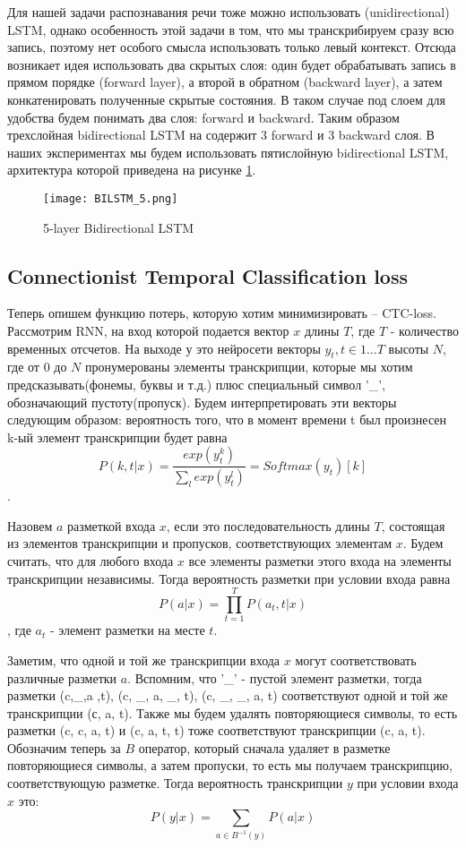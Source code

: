 \documentclass[a4paper,14pt]{extarticle}
\begin{document}
Для нашей задачи распознавания речи тоже можно использовать (unidirectional) LSTM, однако особенность этой задачи в том, что мы транскрибируем сразу всю запись, поэтому нет особого смысла использовать только левый контекст. Отсюда возникает идея использовать два скрытых слоя: один будет обрабатывать запись в прямом порядке (forward layer), а второй в обратном (backward layer), а затем конкатенировать полученные скрытые состояния. В таком случае под слоем для удобства будем понимать два слоя: forward и backward. Таким образом трехслойная bidirectional LSTM на содержит 3 forward и 3 backward слоя. В наших экспериментах мы будем использовать пятислойную bidirectional LSTM, архитектура которой приведена на рисунке \ref{5_bilstm}.
\begin{figure}[!h]
	\centering
	\texttt{[image: BILSTM\_5.png]}%
	\caption{5-layer Bidirectional LSTM}
	\label{5_bilstm}
\end{figure}
\subsection{Connectionist Temporal Classification loss}
Теперь опишем функцию потерь, которую хотим минимизировать -- CTC-loss.
Рассмотрим RNN, на вход которой подается вектор $x$ длины $T$, где $T$ - количество временных отсчетов. На выходе у это нейросети векторы $y_t, t \in 1\dots T$ высоты $N$, где от $0$ до $N$ пронумерованы элементы транскрипции, которые мы хотим предсказывать(фонемы, буквы и т.д.) плюс специальный символ '\_', обозначающий пустоту(пропуск).
Будем интерпретировать эти векторы следующим образом:
вероятность того, что в момент времени t был произнесен k-ый элемент транскрипции будет равна $$P(k,t|x) = \frac{exp(y_t^k)}{\sum\limits_{l} exp(y_t^l)} = Softmax(y_t)[k]$$.

Назовем $a$ разметкой входа $x$, если это последовательность длины $T$, состоящая из элементов транскрипции и пропусков, соответствующих элементам $x$. Будем считать, что для любого входа $x$ все элементы разметки этого входа на элементы транскрипции независимы. Тогда вероятность разметки при условии входа равна $$P(a | x) = \prod \limits_{t=1}^T P(a_t, t|x)$$, где $a_t$ - элемент разметки на месте $t$.

Заметим, что одной и той же транскрипции входа $x$ могут соответствовать различные разметки $a$. Вспомним, что '\_' - пустой элемент разметки, тогда разметки (c,\_,a ,t),
(c, \_, a, \_, t), (c, \_, \_, a, t) соответствуют одной и той же транскрипции (с, a, t). Также мы будем удалять повторяющиеся символы, то есть разметки (c, c, a, t) и (c, a, t, t) тоже соответствуют транскрипции (c, a, t). Обозначим теперь за $B$ оператор, который сначала удаляет в разметке повторяющиеся символы, а затем пропуски, то есть мы получаем транскрипцию, соответствующую разметке. Тогда вероятность транскрипции $y$ при условии входа $x$ это: $$P(y | x) = \sum \limits_{a \in B^{-1}(y)} P(a | x)$$
\end{document}

